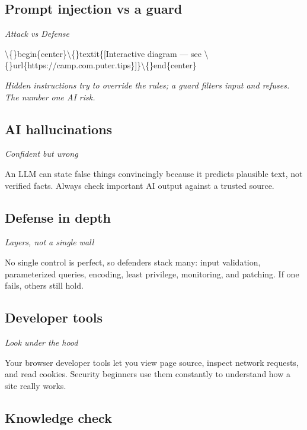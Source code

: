 \documentclass[12pt,openany]{book}
\begin{document}
\subsection*{Prompt injection vs a guard}
{\small\itshape\color{gray}Attack vs Defense}

\textbackslash\{\}begin\{center\}\textbackslash\{\}textit\{[Interactive diagram --- see \textbackslash\{\}url\{https://camp.com.puter.tips\}]\}\textbackslash\{\}end\{center\}

{\small\itshape\color{gray}Hidden instructions try to override the rules; a guard filters input and refuses. The number one AI risk.}

\medskip

\subsection*{AI hallucinations}
{\small\itshape\color{gray}Confident but wrong}


An LLM can state false things convincingly because it predicts plausible text, not verified facts. Always check important AI output against a trusted source.

\medskip

\subsection*{Defense in depth}
{\small\itshape\color{gray}Layers, not a single wall}


No single control is perfect, so defenders stack many: input validation, parameterized queries, encoding, least privilege, monitoring, and patching. If one fails, others still hold.

\medskip

\subsection*{Developer tools}
{\small\itshape\color{gray}Look under the hood}


Your browser developer tools let you view page source, inspect network requests, and read cookies. Security beginners use them constantly to understand how a site really works.

\medskip

\subsection*{Knowledge check}
\end{document}
